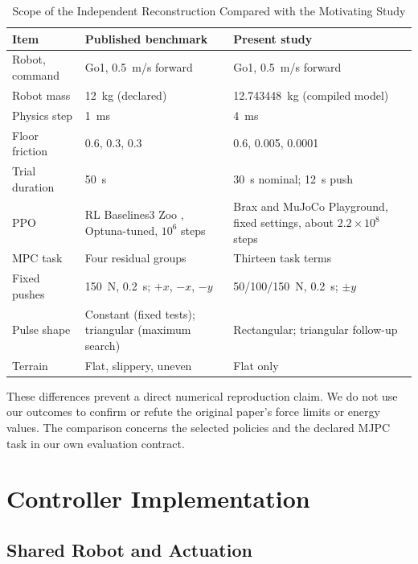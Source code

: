 \documentclass[conference]{IEEEtran}
\begin{document}
\begin{table}[htbp]
\caption{Scope of the Independent Reconstruction Compared with the Motivating Study}
\begin{center}
\footnotesize
\begin{tabular}{|p{1.75cm}|p{2.75cm}|p{2.75cm}|}
\hline
\textbf{Item} & \textbf{Published benchmark \cite{akki2025}} & \textbf{Present study} \\
\hline
Robot, command & Go1, 0.5~m/s forward & Go1, 0.5~m/s forward \\
\hline
Robot mass & 12~kg (declared) & 12.743448~kg (compiled model) \\
\hline
Physics step & 1~ms & 4~ms \\
\hline
Floor friction & 0.6, 0.3, 0.3 & 0.6, 0.005, 0.0001 \\
\hline
Trial duration & 50~s & 30~s nominal; 12~s push \\
\hline
PPO & RL Baselines3 Zoo \cite{rlzoo}, Optuna-tuned, $10^6$ steps & Brax and MuJoCo Playground, fixed settings, about $2.2\times10^8$ steps \\
\hline
MPC task & Four residual groups & Thirteen task terms \\
\hline
Fixed pushes & 150~N, 0.2~s; $+x$, $-x$, $-y$ & 50/100/150~N, 0.2~s; $\pm y$ \\
\hline
Pulse shape & Constant (fixed tests); triangular (maximum search) & Rectangular; triangular follow-up \\
\hline
Terrain & Flat, slippery, uneven & Flat only \\
\hline
\end{tabular}
\label{tab:scope}
\end{center}
\end{table}

These differences prevent a direct numerical reproduction claim. We do not use our outcomes to confirm or refute the original paper's force limits or energy values. The comparison concerns the selected policies and the declared MJPC task in our own evaluation contract.

\section{Controller Implementation}

\subsection{Shared Robot and Actuation}
\end{document}
